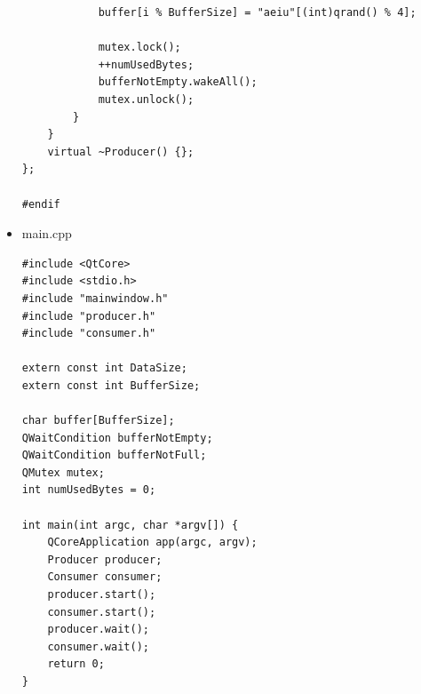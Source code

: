 \documentclass[9pt,b5paper]{article}
\begin{document}
\begin{itemize}
\begin{lstlisting}
            buffer[i % BufferSize] = "aeiu"[(int)qrand() % 4];

            mutex.lock();
            ++numUsedBytes;
            bufferNotEmpty.wakeAll();
            mutex.unlock();
        }
    }
    virtual ~Producer() {};
};

#endif
\end{lstlisting}
\item main.cpp
\lstset{language=java,label= ,caption= ,numbers=none}
\begin{lstlisting}
#include <QtCore>
#include <stdio.h>
#include "mainwindow.h"
#include "producer.h"
#include "consumer.h"

extern const int DataSize;
extern const int BufferSize;

char buffer[BufferSize];
QWaitCondition bufferNotEmpty;
QWaitCondition bufferNotFull;
QMutex mutex;
int numUsedBytes = 0;

int main(int argc, char *argv[]) {
    QCoreApplication app(argc, argv);
    Producer producer;
    Consumer consumer;
    producer.start();
    consumer.start();
    producer.wait();
    consumer.wait();
    return 0;
}
\end{lstlisting}
\end{itemize}
\end{document}
